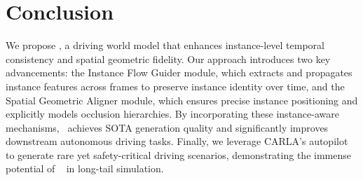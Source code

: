 \section{Conclusion}
\label{section: conclusion}
We propose \titleDef, a driving world model that enhances instance-level temporal consistency and spatial geometric fidelity. Our approach introduces two key advancements: the Instance Flow Guider module, which extracts and propagates instance features across frames to preserve instance identity over time, and the Spatial Geometric Aligner module, which ensures precise instance positioning and explicitly models occlusion hierarchies. By incorporating these instance-aware mechanisms, \titleDef~achieves SOTA generation quality and significantly improves downstream autonomous driving tasks. Finally, we leverage CARLA’s autopilot to generate rare yet safety-critical driving scenarios, demonstrating the immense potential of \titleDef~ in long-tail simulation.




